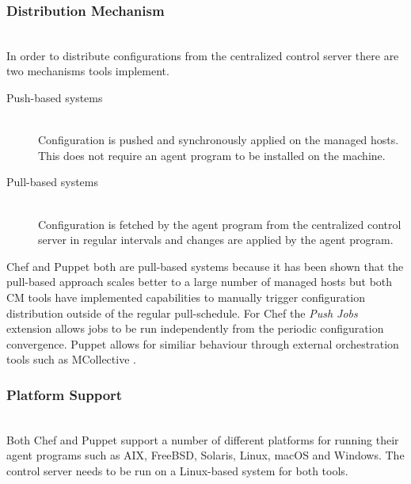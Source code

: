 \subsubsection{Distribution Mechanism}\hfill\\
In order to distribute configurations from the centralized control server there are two mechanisms tools implement.

\begin{description}
	
	\item[Push-based systems] \hfill \\ 
	Configuration is pushed and synchronously applied on the managed hosts. This does not require an agent program to be installed on the machine. 
	
	\item[Pull-based systems] \hfill \\
	Configuration is fetched by the agent program from the centralized control server in regular intervals and changes are applied by the agent program.
	
\end{description}


Chef and Puppet both are pull-based systems because it has been shown that the pull-based approach scales better to a large number of managed hosts but both CM tools have implemented capabilities to manually trigger configuration distribution outside of the regular pull-schedule. For Chef the \textit{Push Jobs} extension allows jobs to be run independently from the periodic configuration convergence. Puppet allows for similiar behaviour through external orchestration tools such as MCollective \cite{mcollective}.

\subsubsection{Platform Support}\hfill\\

Both Chef and Puppet support a number of different platforms for running their agent programs such as AIX, FreeBSD, Solaris, Linux, macOS and Windows. The control server needs to be run on a Linux-based system for both tools.
